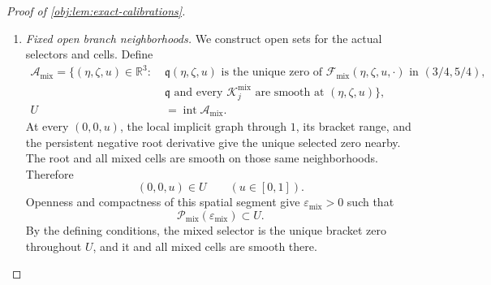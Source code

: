 \documentclass[11pt]{article}
\begin{document}
\begin{proof}[Proof of \cref{obj:lem:exact-calibrations}]
\begin{enumerate}
For each \(m\ge0\), compactness gives positive bounds
\[
\|\mathrm D^m\mathfrak p\|\le B_{\mathrm p,m},
\qquad
\|\mathrm D^m\mathcal K^{\mathrm{fair}}_j\|
\le C^{\mathrm{fair}}_{j,m}
\quad\hbox{on }\mathcal P_{\mathrm{fair}}(\varepsilon_0).
\]
Set
\[
\begin{aligned}
B_{\mathrm{fair},m}
&=B_{\mathrm p,m}
  +\sum_{j\in\mathcal I_{\mathrm{aux}}}C^{\mathrm{fair}}_{j,m},\\
B_{\mathrm{rem},m}
&=\max\{B_{\mathrm{cell},m},B_{\mathrm{fair},m}\},\\
B_m&=\max\{B_{\mathrm q,m},B_{\mathrm{rem},m}\}>0.
\end{aligned}
\]
Restriction to the smaller mixed region
\(\mathcal P_{\mathrm{mix}}(\varepsilon_0)\) preserves its earlier bounds. Thus
\[
\begin{array}{ll}
\|\mathrm D^m\mathfrak q\|\le B_m,\quad
\|\mathrm D^m\mathcal K^{\mathrm{mix}}_j\|\le B_m
&\text{on }\mathcal P_{\mathrm{mix}}(\varepsilon_0),\\[2mm]
\|\mathrm D^m\mathfrak p\|\le B_m,\quad
\|\mathrm D^m\mathcal K^{\mathrm{fair}}_j\|\le B_m
&\text{on }\mathcal P_{\mathrm{fair}}(\varepsilon_0).
\end{array}
\]
All these functions are \(C^\infty\) on their respective closed regions.

\item \emph{Fixed open branch neighborhoods.}
We construct open sets for the actual selectors and cells. Define
\[
\begin{aligned}
\mathcal A_{\mathrm{mix}}
=\bigl\{(\eta,\zeta,u)\in\mathbb R^3:\;&
\mathfrak q(\eta,\zeta,u)
\text{ is the unique zero of }
\mathcal F_{\mathrm{mix}}(\eta,\zeta,u,\cdot)
\text{ in }(3/4,5/4),\\[-1mm]
&\mathfrak q\text{ and every }\mathcal K^{\mathrm{mix}}_j
\text{ are smooth at }(\eta,\zeta,u)\bigr\},\\
U&=\operatorname{int}\mathcal A_{\mathrm{mix}}.
\end{aligned}
\]
At every \((0,0,u)\), the local implicit graph through \(1\), its bracket range, and the persistent negative root derivative give the unique selected zero nearby. The root and all mixed cells are smooth on those same neighborhoods. Therefore
\[
(0,0,u)\in U\qquad(u\in[0,1]).
\]
Openness and compactness of this spatial segment give
\(\varepsilon_{\mathrm{mix}}>0\) such that
\[
\mathcal P_{\mathrm{mix}}(\varepsilon_{\mathrm{mix}})\subset U.
\]
By the defining conditions, the mixed selector is the unique bracket zero throughout \(U\), and it and all mixed cells are smooth there.


\end{enumerate}
\end{proof}
\end{document}
